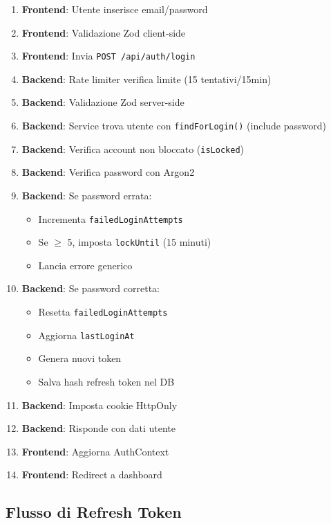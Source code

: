 \documentclass[11pt,a4paper]{article}
\newcommand{\code}[1]{\texttt{#1}}
\begin{document}
\begin{enumerate}
    \item \textbf{Frontend}: Utente inserisce email/password
    \item \textbf{Frontend}: Validazione Zod client-side
    \item \textbf{Frontend}: Invia \code{POST /api/auth/login}
    \item \textbf{Backend}: Rate limiter verifica limite (15 tentativi/15min)
    \item \textbf{Backend}: Validazione Zod server-side
    \item \textbf{Backend}: Service trova utente con \code{findForLogin()} (include password)
    \item \textbf{Backend}: Verifica account non bloccato (\code{isLocked})
    \item \textbf{Backend}: Verifica password con Argon2
    \item \textbf{Backend}: Se password errata:
        \begin{itemize}
            \item Incrementa \code{failedLoginAttempts}
            \item Se $\geq$ 5, imposta \code{lockUntil} (15 minuti)
            \item Lancia errore generico
        \end{itemize}
    \item \textbf{Backend}: Se password corretta:
        \begin{itemize}
            \item Resetta \code{failedLoginAttempts}
            \item Aggiorna \code{lastLoginAt}
            \item Genera nuovi token
            \item Salva hash refresh token nel DB
        \end{itemize}
    \item \textbf{Backend}: Imposta cookie HttpOnly
    \item \textbf{Backend}: Risponde con dati utente
    \item \textbf{Frontend}: Aggiorna AuthContext
    \item \textbf{Frontend}: Redirect a dashboard
\end{enumerate}

\subsection{Flusso di Refresh Token}
\end{document}
